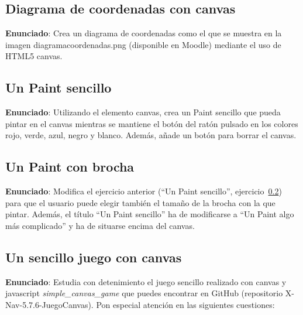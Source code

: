 \subsection{Diagrama de coordenadas con canvas}
\label{subsec:diagrama-coordenadas}

\textbf{Enunciado}: Crea un diagrama de coordenadas como el que se muestra en la imagen diagramacoordenadas.png (disponible en Moodle) mediante el uso de HTML5 canvas.

\subsection{Un Paint sencillo}
\label{subsec:paint-sencillo}

\textbf{Enunciado}: Utilizando el elemento canvas, crea un Paint sencillo que pueda pintar en el canvas mientras se mantiene el botón del ratón pulsado en los colores rojo, verde, azul, negro y blanco. Además, añade un botón para borrar el canvas.


\subsection{Un Paint con brocha}
\label{subsec:paint-brocha}

\textbf{Enunciado}: Modifica el ejercicio anterior (``Un Paint sencillo'', ejercicio~\ref{subsec:paint-sencillo}) para que el usuario puede elegir también el tamaño de la brocha con la que pintar. Además, el título ``Un Paint sencillo'' ha de modificarse a ``Un Paint algo más complicado'' y ha de situarse encima del canvas.

\subsection{Un sencillo juego con canvas}
\label{subsec:estudia-juego}

\textbf{Enunciado}: Estudia con detenimiento el juego sencillo realizado
con canvas y javascript \emph{simple\_canvas\_game} que puedes encontrar en GitHub
(repositorio X-Nav-5.7.6-JuegoCanvas). Pon especial atención en las siguientes cuestiones:

